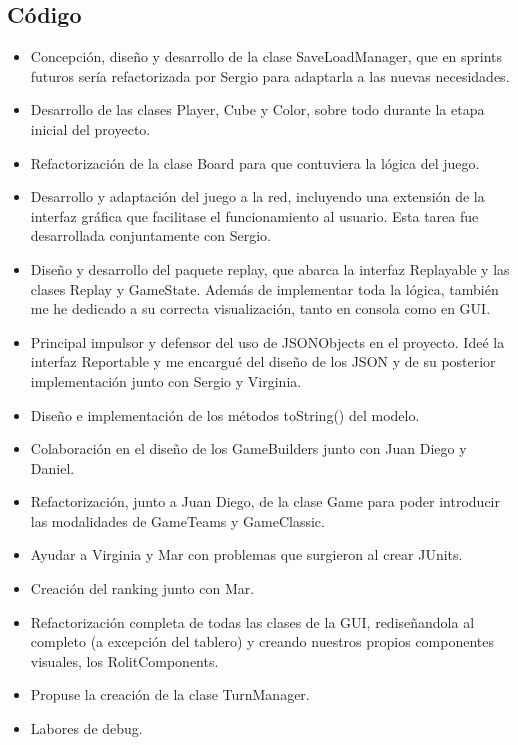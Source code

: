 \documentclass[../FINAL/Scrum/SCRUM.tex]{subfiles}
\begin{document}
\subsection*{Código}
\begin{itemize}
\item Concepción, diseño y desarrollo de la clase SaveLoadManager, que en sprints futuros sería refactorizada por Sergio para adaptarla a las nuevas necesidades.

\item Desarrollo de las clases Player, Cube y Color, sobre todo durante la etapa inicial del proyecto.

\item Refactorización de la clase Board para que contuviera la lógica del juego.

\item Desarrollo y adaptación del juego a la red, incluyendo una extensión de la interfaz gráfica que facilitase el funcionamiento al usuario. Esta tarea fue desarrollada conjuntamente con Sergio.

\item Diseño y desarrollo del paquete replay, que abarca la interfaz Replayable y las clases Replay y GameState. Además de implementar toda la lógica, también me he dedicado a su correcta visualización, tanto en consola como en GUI.

\item Principal impulsor y defensor del uso de JSONObjects en el proyecto. Ideé la interfaz Reportable y me encargué del diseño de los JSON y de su posterior implementación junto con Sergio y Virginia.

\item Diseño e implementación de los métodos toString() del modelo.

\item Colaboración en el diseño de los GameBuilders junto con Juan Diego y Daniel.

\item Refactorización, junto a Juan Diego, de la clase Game para poder introducir las modalidades de GameTeams y GameClassic.

\item Ayudar a Virginia y Mar con problemas que surgieron al crear JUnits.

\item Creación del ranking junto con Mar.

\item Refactorización completa de todas las clases de la GUI, rediseñandola al completo (a excepción del tablero) y creando nuestros propios componentes visuales, los RolitComponents.

\item Propuse la creación de la clase TurnManager.

\item Labores de debug.

\end{itemize}
\end{document}
